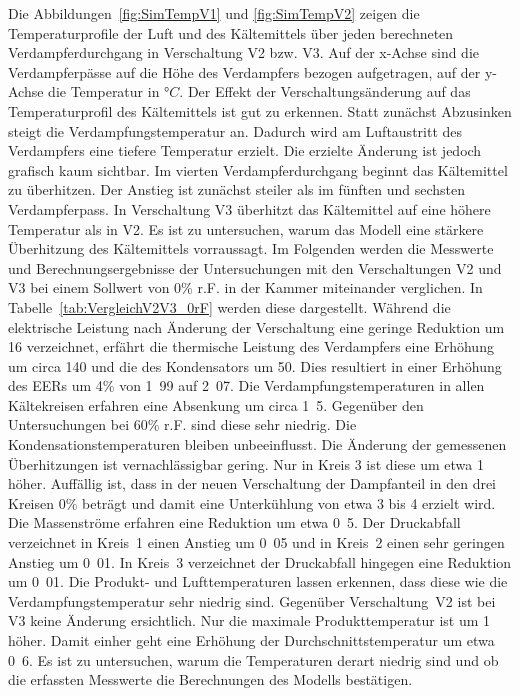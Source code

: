 Die Abbildungen~\ref{fig:SimTempV1} und \ref{fig:SimTempV2} zeigen die Temperaturprofile der Luft und des Kältemittels über jeden berechneten Verdampferdurchgang in Verschaltung V2 bzw. V3. Auf der x-Achse sind die Verdampferpässe auf die Höhe des Verdampfers bezogen aufgetragen, auf der y-Achse die Temperatur in °$C$. Der Effekt der Verschaltungsänderung auf das Temperaturprofil des Kältemittels ist gut zu erkennen. Statt zunächst Abzusinken steigt die Verdampfungstemperatur an. Dadurch wird am Luftaustritt des Verdampfers eine tiefere Temperatur erzielt. Die erzielte Änderung ist jedoch grafisch kaum sichtbar. Im vierten Verdampferdurchgang beginnt das Kältemittel zu überhitzen. Der Anstieg ist zunächst steiler als im fünften und sechsten Verdampferpass. In Verschaltung V3 überhitzt das Kältemittel auf eine höhere Temperatur als in V2. Es ist zu untersuchen, warum das Modell eine stärkere Überhitzung des Kältemittels vorraussagt. \newline
Im Folgenden werden die Messwerte und Berechnungsergebnisse der Untersuchungen mit den Verschaltungen V2 und V3 bei einem Sollwert von \unit{0}{\%} r.F. in der Kammer miteinander verglichen. In Tabelle~\ref{tab:VergleichV2V3_0rF} werden diese dargestellt. Während die elektrische Leistung nach Änderung der Verschaltung eine geringe Reduktion um \unit{16}{\watt} verzeichnet, erfährt die thermische Leistung des Verdampfers eine Erhöhung um circa \unit{140}{\watt} und die des Kondensators um \unit{50}{\watt}. Dies resultiert in einer Erhöhung des EERs um \unit{4}{\%} von \unit{1.99}{} auf \unit{2.07}{}.
Die Verdampfungstemperaturen in allen Kältekreisen erfahren eine Absenkung um circa \unit{1.5}{\kelvin}. Gegenüber den Untersuchungen bei \unit{60}{\%} r.F. sind diese sehr niedrig. Die Kondensationstemperaturen bleiben unbeeinflusst. Die Änderung der gemessenen Überhitzungen ist vernachlässigbar gering. Nur in Kreis 3 ist diese um etwa \unit{1}{\kelvin} höher. Auffällig ist, dass in der neuen Verschaltung der Dampfanteil in den drei Kreisen \unit{0}{\%} beträgt und damit eine Unterkühlung von etwa \unit{3}{\kelvin} bis \unit{4}{\kelvin} erzielt wird. Die Massenströme erfahren eine Reduktion um etwa \unit{0.5}{\gram\per\second}. Der Druckabfall verzeichnet in Kreis~1 einen Anstieg um \unit{0.05}{\bbar} und in Kreis~2 einen sehr geringen Anstieg um \unit{0.01}{\bbar}. In Kreis~3 verzeichnet der Druckabfall hingegen eine Reduktion um \unit{0.01}{\bbar}. Die Produkt- und Lufttemperaturen lassen erkennen, dass diese wie die Verdampfungstemperatur sehr niedrig sind. Gegenüber Verschaltung~V2 ist bei V3 keine Änderung ersichtlich. Nur die maximale Produkttemperatur ist um \unit{1}{\kelvin} höher. Damit einher geht eine Erhöhung der Durchschnittstemperatur um etwa \unit{0.6}{\kelvin}. Es ist zu untersuchen, warum die Temperaturen derart niedrig sind und ob die erfassten Messwerte die Berechnungen des Modells bestätigen.

